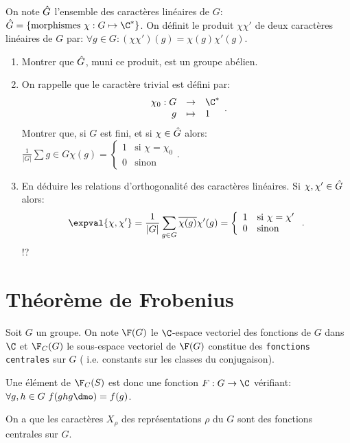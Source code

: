 \begin{exercise}
	On note $\Hat G$ l'ensemble des caractères linéaires de $G$: $\Hat G=\{\text{morphismes }\chi:G\mapsto \C^*\}$. On définit le produit $\chi\chi'$ de deux caractères linéaires de $G$ par: $\forall g \in G: (\chi\chi')(g)=\chi(g)\chi'(g)$.

	\begin{enumerate}
		\item Montrer que $\Hat G$, muni ce produit, est un groupe abélien.
		\item On rappelle que le caractère trivial est défini par: $$\begin{array}{rcl}\chi_0:G &\rightarrow& \C^\ast\\ g&\mapsto& 1\end{array}.$$
		Montrer que, si $G$ est fini, et si $\chi \in\Hat G$ alors:
		$\frac 1{|G|}\sum g\in G\chi(g)=\left\{\begin{array}{cl} 1 & \text{si $\chi=\chi_0$} \\ 0 & \text{sinon}\end{array}\right. $.
		\item En déduire les relations d'orthogonalité des caractères linéaires. Si $\chi,\chi'\in\Hat G$ alors:
		$$\expval{\chi,\chi'}=\frac 1{|G|}\sum_{g\in G}\overline{\chi(g)}\chi'(g)=\left\{ \begin{array}{cl}1&\text{si $\chi=\chi'$}\\0&\text{sinon}\end{array}\right..$$!?
	\end{enumerate}
\end{exercise}

\section{Théorème de Frobenius}

Soit $G$ un groupe.
On note $\F(G)$ le $\C$-espace vectoriel des fonctions de $G$ dans $\C$ et $\F_C(G)$ le sous-espace vectoriel de $\F(G)$ constitue des \texttt{fonctions centrales} sur $G$ ( i.e. constants sur les classes du conjugaison).

Une élément de $\F_C(S)$ est donc une fonction $F:G\rightarrow\C$ vérifiant: $\forall g,h\in G\ f(ghg\dmo)=f(g)$.

\begin{remark}	
	On a que les caractères $X_ρ$ des représentations $ρ$ du $G$ sont des fonctions centrales sur $G$.
\end{remark}


